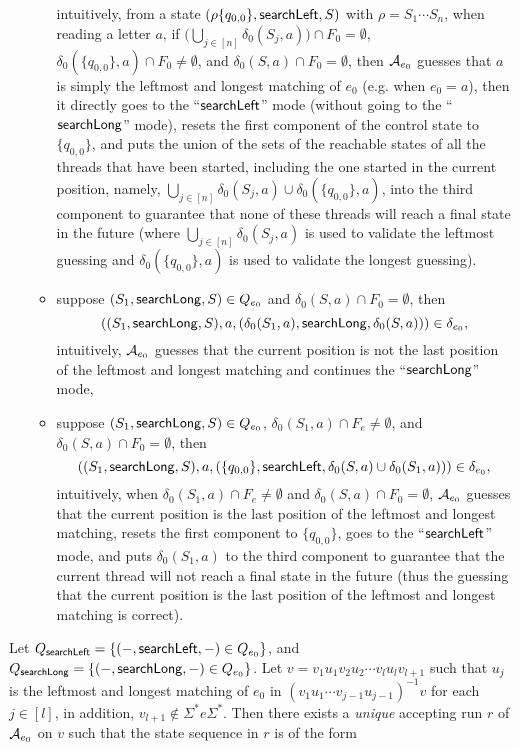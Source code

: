 \begin{itemize}
\begin{itemize}
		\medskip
		intuitively, from a state $(\rho \{q_{0,0}\}, \mathsf{searchLeft}, S)$ with $\rho = S_1 \cdots S_n$, when reading a letter $a$, if $\big(\bigcup \limits_{j \in [n]} \delta_0(S_j, a) \big) \cap F_0 = \emptyset$, $\delta_0(\{q_{0,0}\}, a) \cap F_0 \neq \emptyset$, and $\delta_0(S,a) \cap F_0 = \emptyset$, then $\mathcal{A}_{e_0}$  guesses that $a$ is simply the leftmost and longest matching of $e_0$ (e.g. when $e_0= a$), then it directly goes to the ``$\mathsf{searchLeft}$'' mode (without going to the ``$\mathsf{searchLong}$'' mode), resets the first component of the control state to $\{q_{0,0}\}$, and puts the union of the sets of the reachable states of all the threads that have been started, including the one started in the current position, namely, $\bigcup \limits_{j \in [n]} \delta_0(S_j, a) \cup \delta_0(\{q_{0,0}\}, a)$, into the third component to  guarantee that none of these threads will reach a final state in the future (where $\bigcup \limits_{j \in [n]} \delta_0(S_j, a)$ is used to validate the leftmost guessing and $\delta_0(\{q_{0,0}\}, a)$ is used to validate the longest guessing).
		\item suppose $(S_1, \mathsf{searchLong}, S) \in Q_{e_0}$ and $\delta_0(S,a) \cap F_0 = \emptyset$, then 
		$$((S_1, \mathsf{searchLong}, S), a, (\delta_0(S_1,a), \mathsf{searchLong}, \delta_0(S,a))) \in \delta_{e_0},$$
		intuitively, $\mathcal{A}_{e_0}$ guesses that the current position is not the last position of the leftmost and longest matching and continues the ``$\mathsf{searchLong}$'' mode,
		\item suppose $(S_1, \mathsf{searchLong}, S) \in Q_{e_0}$, $\delta_0(S_1,a) \cap F_e \neq \emptyset$, and $\delta_0(S,a) \cap F_0 = \emptyset$, then 
		$$((S_1, \mathsf{searchLong}, S), a, (\{q_{0,0}\}, \mathsf{searchLeft}, \delta_0(S,a) \cup \delta_0(S_1,a))) \in \delta_{e_0},$$
		intuitively, when $\delta_0(S_1,a) \cap F_e \neq \emptyset$ and $\delta_0(S,a) \cap F_0 = \emptyset$, $\mathcal{A}_{e_0}$ guesses that the current position is the last position of the leftmost and longest matching, resets the first component to $\{q_{0,0}\}$, goes to the ``$\mathsf{searchLeft}$'' mode, and puts $\delta_0(S_1, a)$ to the third component to guarantee that the current thread will not reach a final state in the future (thus the guessing that the current position is the last position of the leftmost and longest matching is correct).
	\end{itemize}
\end{itemize}

Let $Q_{\mathsf{searchLeft}}  = \{ (-, \mathsf{searchLeft}, -) \in Q_{e_0} \}$,  and $Q_{\mathsf{searchLong}} = \{ (-, \mathsf{searchLong}, -)  \in Q_{e_0}\}$.
Let $v = v_1 u_1 v_2 u_2 \cdots v_l u_l v_{l+1}$ such that $u_j$ is the leftmost and longest matching of $e_0$ in $(v_1 u_1 \cdots v_{j-1} u_{j-1})^{-1} v$ for each $j \in [l]$, in addition, $v_{l+1} \not \in \Sigma^\ast e \Sigma^\ast$. Then there exists a \emph{unique} accepting run $r$ of $\mathcal{A}_{e_0}$ on $v$ such that the state sequence in $r$ is of the form 


